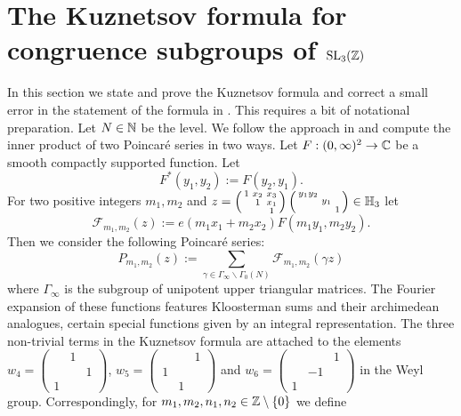 \documentclass[11pt]{amsart}
\theoremstyle{plain}
\numberwithin{equation}{section}
\theoremstyle{definition}
\begin{document}
\section{The Kuznetsov formula for congruence subgroups of ${\rm SL}_3(\Bbb{Z})$}

In this section we state and prove  the Kuznetsov formula and correct a small error in the statement of the formula in \cite{Bl}. This requires a bit of notational preparation. 
Let $N \in \Bbb{N}$ be the level. We follow the approach in \cite{Bl} and compute the inner product of two Poincar\'e series in two ways.  Let $F : (0, \infty)^2 \rightarrow \Bbb{C}$ be a smooth compactly supported function. Let
\begin{equation}\label{Fast}
  F^{\ast}(y_1, y_2) := F(y_2, y_1). 
\end{equation}
 For two positive integers $m_1, m_2$ and $z  = \left( \begin{smallmatrix} 1 & x_2 & x_3\\ & 1 & x_1\\ & & 1\end{smallmatrix}\right) \left(\begin{smallmatrix} y_1y_2 & & \\ & y_1 & \\ & & 1\end{smallmatrix}\right) \in \Bbb{H}_3$ let $$\mathcal{F}_{m_1, m_2}(z) := e(m_1x_1 + m_2x_2) F(m_1y_1, m_2y_2).$$ Then we consider   the following Poincar\'e series:
\begin{displaymath}
  P_{m_1, m_2}(z) := \sum_{\gamma \in  \Gamma_{\infty} \backslash  \Gamma_0(N)} \mathcal{F}_{m_1, m_2}(\gamma z)
\end{displaymath}
where $\Gamma_{\infty}$ is the subgroup of unipotent upper triangular matrices. The Fourier expansion of these functions features Kloosterman sums and their archimedean analogues, certain special functions given by an integral representation. The three non-trivial terms in the Kuznetsov formula are attached to the elements $w_4 = \left(\begin{smallmatrix} & 1 &\\ & & 1\\ 1 & &\end{smallmatrix}\right)$, $w_5 =  \left(\begin{smallmatrix} &  &1\\ 1& & \\  & 1&\end{smallmatrix}\right)$ and $w_6 =  \left(\begin{smallmatrix} &  &1\\ & -1& \\ 1 & &\end{smallmatrix}\right)$ in the Weyl group. Correspondingly, for $m_1, m_2, n_1, n_2 \in \Bbb{Z} \setminus \{0\}$  we define%
\end{document}
